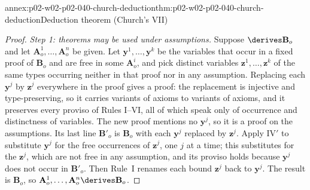 \begin{annexitem}{annex:p02-w02-p02-040-church-deduction}{thm:p02-w02-p02-040-church-deduction}{Deduction theorem (Church's VII)}
\begin{proof}
\emph{Step 1: theorems may be used under assumptions.}  Suppose
\(\derives\mathbf B_o\) and let \(\mathbf A^1_o,\ldots,\mathbf A^n_o\) be
given.  Let \(\mathbf y^1,\ldots,\mathbf y^k\) be the variables that occur
in a fixed proof of \(\mathbf B_o\) and are free in some
\(\mathbf A^i_o\), and pick distinct variables \(\mathbf z^1,\ldots,\mathbf z^k\)
of the same types occurring neither in that proof nor in any assumption.
Replacing each \(\mathbf y^j\) by \(\mathbf z^j\) everywhere in the proof
gives a proof: the replacement is injective and type-preserving, so it
carries variants of axioms to variants of axioms, and it preserves every
proviso of Rules I--VI, all of which speak only of occurrence and
distinctness of variables.  The new proof mentions no \(\mathbf y^j\), so it
is a proof on the assumptions.  Its last line \(\mathbf B'_o\) is
\(\mathbf B_o\) with each \(\mathbf y^j\) replaced by \(\mathbf z^j\).
Apply IV\('\) to substitute \(\mathbf y^j\) for the free occurrences of
\(\mathbf z^j\), one \(j\) at a time; this substitutes for the
\(\mathbf z^j\), which are not free in any assumption, and its proviso holds
because \(\mathbf y^j\) does not occur in \(\mathbf B'_o\).  Then Rule~I
renames each bound \(\mathbf z^j\) back to \(\mathbf y^j\).  The result is
\(\mathbf B_o\), so \(\mathbf A^1_o,\ldots,\mathbf A^n_o\derives\mathbf B_o\).


\end{proof}
\end{annexitem}
